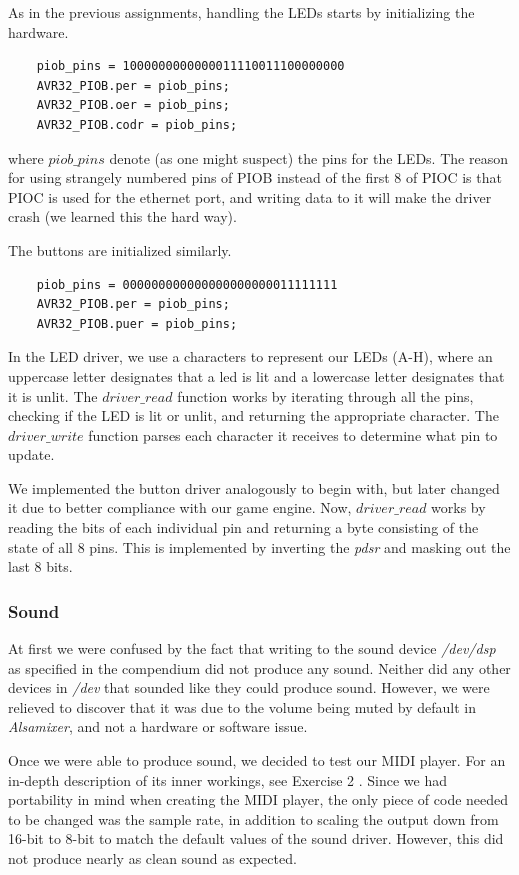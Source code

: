 \documentclass[a4paper,12pt]{article}
\begin{document}
As in the previous assignments, handling the LEDs starts by initializing the hardware.

\begin{verbatim}
	piob_pins = 1000000000000011110011100000000
	AVR32_PIOB.per = piob_pins;
	AVR32_PIOB.oer = piob_pins;
	AVR32_PIOB.codr = piob_pins;
\end{verbatim}

where $piob\_pins$ denote (as one might suspect) the pins for the LEDs. The reason for using strangely numbered pins of PIOB instead of the first 8 of PIOC is that PIOC is used for the ethernet port, and writing data to it will make the driver crash (we learned this the hard way).

The buttons are initialized similarly.

\begin{verbatim}
	piob_pins = 000000000000000000000011111111
	AVR32_PIOB.per = piob_pins;
	AVR32_PIOB.puer = piob_pins;
\end{verbatim}

In the LED driver, we use a characters to represent our LEDs (A-H), where an uppercase letter designates that a led is lit and a lowercase letter designates that it is unlit. The $driver\_read$ function works by iterating through all the pins, checking if the LED is lit or unlit, and returning the appropriate character. The $driver\_write$ function parses each character it receives to determine what pin to update.

We implemented the button driver analogously to begin with, but later changed it due to better compliance with our game engine. Now, $driver\_read$ works by reading the bits of each individual pin and returning a byte consisting of the state of all 8 pins. This is implemented by inverting the \emph{pdsr} and masking out the last 8 bits.

\subsubsection{Sound} %

At first we were confused by the fact that writing to the sound device \emph{/dev/dsp} as specified in the compendium \cite[p.60]{compendium} did not produce any sound. Neither did any other devices in \emph{/dev} that sounded like they could produce sound. However, we were relieved to discover that it was due to the volume being muted by default in \emph{Alsamixer}, and not a hardware or software issue.

Once we were able to produce sound, we decided to test our MIDI player. For an in-depth description of its inner workings, see Exercise 2 \cite{ex2}. Since we had portability in mind when creating the MIDI player, the only piece of code needed to be changed was the sample rate, in addition to scaling the output down from 16-bit to 8-bit to match the default values of the sound driver. However, this did not produce nearly as clean sound as expected.
\end{document}
